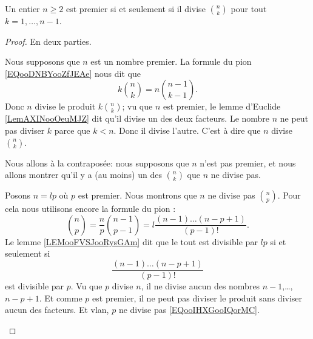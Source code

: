 \begin{proposition}	\label{PROPooVPOYooNNugWU}
	Un entier \( n\geq 2\) est premier si et seulement si il divise \( \binom{ n }{ k }\) pour tout \( k=1,\ldots,n-1\).
\end{proposition}

\begin{proof}
	En deux parties.
	\begin{subproof}
		\spitem[\( \Rightarrow\)]
		Nous supposons que \( n\) est un nombre premier. La formule du pion \eqref{EQooDNBYooZfJEAe} nous dit que
		\begin{equation}
			k\binom{ n }{ k }=n\binom{ n-1 }{ k-1 }.
		\end{equation}
		Donc \( n\) divise le produit \(k\binom{ n }{ k }\); vu que \( n\) est premier, le lemme d'Euclide \ref{LemAXINooOeuMJZ} dit qu'il divise un des deux facteurs. Le nombre \( n\) ne peut pas diviser \( k\) parce que \( k<n\). Donc il divise l'autre. C'est à dire que \( n\) divise \( \binom{ n }{ k }\).

		\spitem[\( \Leftarrow\)]
		Nous allons à la contraposée: nous supposons que \( n\) n'est pas premier, et nous allons montrer qu'il y a (au moins) un des \( \binom{ n }{ k }\) que \( n\) ne divise pas.

		Posons \( n=lp\) où \( p\) est premier. Nous montrons que \( n\) ne divise pas \( \binom{ n }{ p }\). Pour cela nous utilisons encore la formule du pion :
		\begin{equation}
			\binom{ n }{ p }=\frac{ n }{ p }\binom{ n-1 }{ p-1 }=l\frac{ (n-1)\ldots (n-p+1) }{ (p-1)! }.
		\end{equation}
		Le lemme \ref{LEMooFVSJooRysGAm} dit que le tout est divisible par \( lp\) si et seulement si
		\begin{equation}		\label{EQooIHXGooIQorMC}
			\frac{ (n-1)\ldots (n-p+1) }{ (p-1)! }
		\end{equation}
		est divisible par \( p\). Vu que \( p\) divise \( n\), il ne divise aucun des nombres \( n-1\),\ldots,\( n-p+1\). Et comme \( p\) est premier, il ne peut pas diviser le produit sans diviser aucun des facteurs. Et vlan, \( p\) ne divise pas \eqref{EQooIHXGooIQorMC}.
	\end{subproof}
\end{proof}

